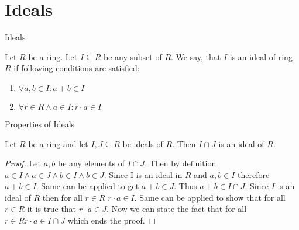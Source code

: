 \documentclass{beamer}
\begin{document}
\section{Ideals}

\begin{frame}{Ideals}
    \begin{definition}
        Let $R$ be a ring. Let $I \subseteq R$ be any subset of $R$. We say, that $I$ is an \alert{ideal of ring $R$} if following conditions are satisfied:
        \begin{enumerate}
            \item $\forall a,b \in I : a + b \in I$ 
            \item $\forall r \in R \land a \in I : r \cdot a \in I$
        \end{enumerate}
    \end{definition}
    
\end{frame}
\begin{frame}{Properties of Ideals}
    \begin{theorem}
        Let $R$ be a ring and let $I,J \subseteq R$ be ideals of $R$. Then $I \cap J$ is an ideal of $R$. 
    \end{theorem}
    \pause
    \begin{proof}
        Let $a,b$ be any elements of $I \cap J$. Then by definition $a \in I \land a \in J \land b \in I \land b \in J$. Since I is an ideal in $R$ and $a,b \in I$ therefore $a + b \in I$. Same can be applied to get $a + b \in J$. Thus $a + b \in I \cap J$. 
        Since $I$ is an ideal of $R$ then for all $r \in R$ $r \cdot a \in I$. Same can be applied to show that for all $r \in R$  it is true that $r \cdot a \in J$. Now we can state the fact that for all $r \in R  r\cdot a \in I \cap J$ which ends the proof.
    \end{proof}
\end{frame}
\end{document}
